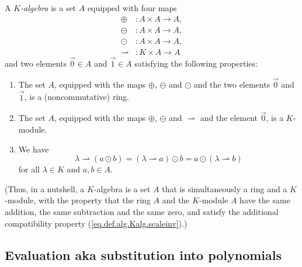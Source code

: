 \begin{definition}
\label{def.alg.Kalg}
\leantarget
\leanok
A $K$\emph{-algebra} is a set $A$ equipped with four maps%
\begin{align*}
\oplus &  :A\times A\rightarrow A,\\
\ominus &  :A\times A\rightarrow A,\\
\odot &  :A\times A\rightarrow A,\\
\rightharpoonup &  :K\times A\rightarrow A
\end{align*}
and two elements $\overrightarrow{0}\in A$ and $\overrightarrow{1}\in A$
satisfying the following properties:

\begin{enumerate}
\item The set $A$, equipped with the maps $\oplus$, $\ominus$ and $\odot$ and
the two elements $\overrightarrow{0}$ and $\overrightarrow{1}$, is a
(noncommutative) ring.

\item The set $A$, equipped with the maps $\oplus$, $\ominus$ and
$\rightharpoonup$ and the element $\overrightarrow{0}$, is a $K$-module.

\item We have%
\begin{equation}
\lambda\rightharpoonup\left(  a\odot b\right)  =\left(  \lambda\rightharpoonup
a\right)  \odot b=a\odot\left(  \lambda\rightharpoonup b\right)
\label{eq.def.alg.Kalg.scaleinv}%
\end{equation}
for all $\lambda\in K$ and $a,b\in A$.
\end{enumerate}

(Thus, in a nutshell, a $K$-algebra is a set $A$ that is simultaneously a ring
and a $K$-module, with the property that the ring $A$ and the $K$-module $A$
have the same addition, the same subtraction and the same zero, and satisfy
the additional compatibility property (\ref{eq.def.alg.Kalg.scaleinv}).)
\end{definition}

\subsection{Evaluation aka substitution into polynomials}

